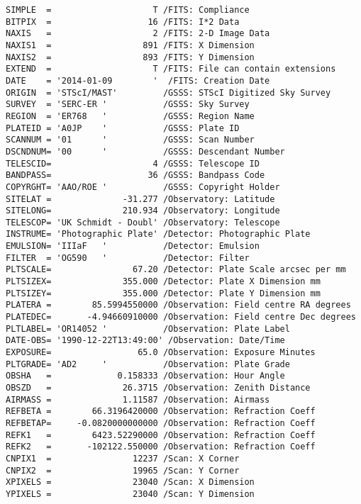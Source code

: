 \documentclass[11pt]{article}
\makeatletter
\newcommand{\boxspacing}{\kern\kvtcb@left@rule\kern\kvtcb@boxsep}
\newcommand{\prompt}[4]{
        {\ttfamily\llap{{\color{#2}[#3]:\hspace{3pt}#4}}\vspace{-\baselineskip}}
    }
\makeatother
\begin{document}
            \begin{tcolorbox}[breakable, size=fbox, boxrule=.5pt, pad at break*=1mm, opacityfill=0]
\prompt{Out}{outcolor}{7}{\boxspacing}
\begin{Verbatim}[commandchars=\\\{\}]
SIMPLE  =                    T /FITS: Compliance
BITPIX  =                   16 /FITS: I*2 Data
NAXIS   =                    2 /FITS: 2-D Image Data
NAXIS1  =                  891 /FITS: X Dimension
NAXIS2  =                  893 /FITS: Y Dimension
EXTEND  =                    T /FITS: File can contain extensions
DATE    = '2014-01-09        '  /FITS: Creation Date
ORIGIN  = 'STScI/MAST'         /GSSS: STScI Digitized Sky Survey
SURVEY  = 'SERC-ER '           /GSSS: Sky Survey
REGION  = 'ER768   '           /GSSS: Region Name
PLATEID = 'A0JP    '           /GSSS: Plate ID
SCANNUM = '01      '           /GSSS: Scan Number
DSCNDNUM= '00      '           /GSSS: Descendant Number
TELESCID=                    4 /GSSS: Telescope ID
BANDPASS=                   36 /GSSS: Bandpass Code
COPYRGHT= 'AAO/ROE '           /GSSS: Copyright Holder
SITELAT =              -31.277 /Observatory: Latitude
SITELONG=              210.934 /Observatory: Longitude
TELESCOP= 'UK Schmidt - Doubl' /Observatory: Telescope
INSTRUME= 'Photographic Plate' /Detector: Photographic Plate
EMULSION= 'IIIaF   '           /Detector: Emulsion
FILTER  = 'OG590   '           /Detector: Filter
PLTSCALE=                67.20 /Detector: Plate Scale arcsec per mm
PLTSIZEX=              355.000 /Detector: Plate X Dimension mm
PLTSIZEY=              355.000 /Detector: Plate Y Dimension mm
PLATERA =        85.5994550000 /Observation: Field centre RA degrees
PLATEDEC=       -4.94660910000 /Observation: Field centre Dec degrees
PLTLABEL= 'OR14052 '           /Observation: Plate Label
DATE-OBS= '1990-12-22T13:49:00' /Observation: Date/Time
EXPOSURE=                 65.0 /Observation: Exposure Minutes
PLTGRADE= 'AD2     '           /Observation: Plate Grade
OBSHA   =             0.158333 /Observation: Hour Angle
OBSZD   =              26.3715 /Observation: Zenith Distance
AIRMASS =              1.11587 /Observation: Airmass
REFBETA =        66.3196420000 /Observation: Refraction Coeff
REFBETAP=     -0.0820000000000 /Observation: Refraction Coeff
REFK1   =        6423.52290000 /Observation: Refraction Coeff
REFK2   =       -102122.550000 /Observation: Refraction Coeff
CNPIX1  =                12237 /Scan: X Corner
CNPIX2  =                19965 /Scan: Y Corner
XPIXELS =                23040 /Scan: X Dimension
YPIXELS =                23040 /Scan: Y Dimension

\end{Verbatim}
\end{tcolorbox}
\end{document}

